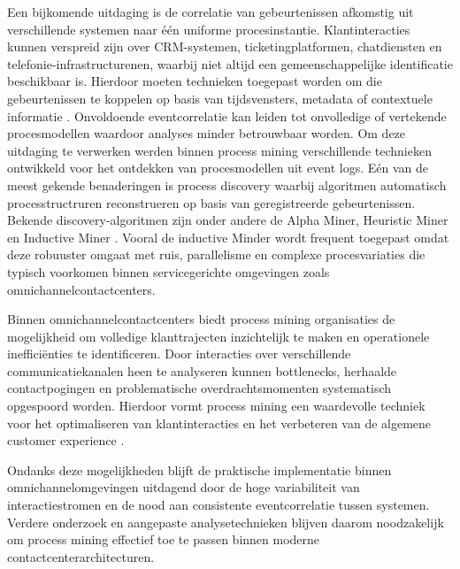 Een bijkomende uitdaging is de correlatie van gebeurtenissen afkomstig uit verschillende systemen naar één uniforme procesinstantie. Klantinteracties kunnen verspreid zijn over CRM-systemen, ticketingplatformen, chatdiensten en telefonie-infrastructurenen, waarbij niet altijd een gemeenschappelijke identificatie beschikbaar is. Hierdoor moeten technieken toegepast worden om die gebeurtenissen te koppelen op basis van tijdsvensters, metadata of contextuele informatie \autocite{Zelst2020}. Onvoldoende eventcorrelatie kan leiden tot onvolledige of vertekende procesmodellen waardoor analyses minder betrouwbaar worden.
Om deze uitdaging te verwerken werden binnen process mining verschillende technieken ontwikkeld voor het ontdekken van procesmodellen uit event logs. Eén van de meest gekende benaderingen is process discovery waarbij algoritmen automatisch processtructruren reconstrueren op basis van geregistreerde gebeurtenissen. Bekende discovery-algoritmen zijn onder andere de Alpha Miner, Heuristic Miner en Inductive Miner \autocite{vanDerAalst2016}. Vooral de inductive Minder wordt frequent toegepast omdat deze robuuster omgaat met ruis, parallelisme en complexe procesvariaties die typisch voorkomen binnen servicegerichte omgevingen zoals omnichannelcontactcenters.

Binnen omnichannelcontactcenters biedt process mining organisaties de mogelijkheid om volledige klanttrajecten inzichtelijk te maken en operationele inefficiënties te identificeren. Door interacties over verschillende communicatiekanalen heen te analyseren kunnen bottlenecks, herhaalde contactpogingen en problematische overdrachtsmomenten systematisch opgespoord worden. Hierdoor vormt process mining een waardevolle techniek voor het optimaliseren van klantinteracties en het verbeteren van de algemene customer experience \autocite{kalra2024}.

Ondanks deze mogelijkheden blijft de praktische implementatie binnen omnichannelomgevingen uitdagend door de hoge variabiliteit van interactiestromen en de nood aan consistente eventcorrelatie tussen systemen. Verdere onderzoek en aangepaste analysetechnieken blijven daarom noodzakelijk om process mining effectief toe te passen binnen moderne contactcenterarchitecturen.



